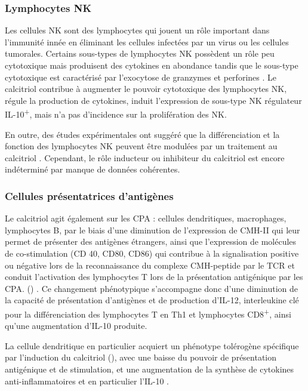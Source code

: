 \documentclass[
  a4paper,
  DIV=11,
  numbers=noendperiod,
  listof=totoc]{scrreprt}
\begin{document}
\subsubsection{Lymphocytes NK}\label{lymphocytes-nk}

Les cellules \ac{NK} sont des lymphocytes qui jouent un rôle important
dans l'immunité innée en éliminant les cellules infectées par un virus
ou les cellules tumorales. Certains sous-types de lymphocytes NK
possèdent un rôle peu cytotoxique mais produisent des cytokines en
abondance tandis que le sous-type cytotoxique est caractérisé par
l'exocytose de granzymes et perforines \autocite{Moretta.2008}. Le
calcitriol contribue à augmenter le pouvoir cytotoxique des lymphocytes
\ac{NK}, régule la production de cytokines, induit l'expression de
sous-type NK régulateur IL-10\textsuperscript{+}, mais n'a pas
d'incidence sur la prolifération des \ac{NK}.

En outre, des études expérimentales ont suggéré que la différenciation
et la fonction des lymphocytes \ac{NK} peuvent être modulées par un
traitement au calcitriol \autocite{Charoenngam.2020}. Cependant, le rôle
inducteur ou inhibiteur du calcitriol est encore indéterminé par manque
de données cohérentes.

\subsubsection{Cellules présentatrices
d'antigènes}\label{cellules-pruxe9sentatrices-dantiguxe8nes}

Le calcitriol agit également sur les \ac{CPA} : cellules dendritiques,
macrophages, lymphocytes B, par le biais d'une diminution de
l'expression de \ac{CMH-II} qui leur permet de présenter des antigènes
étrangers, ainsi que l'expression de molécules de co-stimulation
(\ac{CD} 40, CD80, CD86) qui contribue à la signalisation positive ou
négative lors de la reconnaissance du complexe CMH-peptide par le
\ac{TCR} et conduit l'activation des lymphocytes T lors de la
présentation antigénique par les \ac{CPA}. ()
\autocite{Charoenngam.2020,Meza-Meza.2022,Caprio.2017}. Ce changement
phénotypique s'accompagne donc d'une diminution de la capacité de
présentation d'antigènes et de production d'\ac{IL-12}, interleukine clé
pour la différenciation des lymphocytes T en Th1 et lymphocytes
CD8\textsuperscript{+}, ainsi qu'une augmentation d'\ac{IL-10} produite.

La cellule dendritique en particulier acquiert un phénotype tolérogène
spécifique par l'induction du calcitriol (), avec
une baisse du pouvoir de présentation antigénique et de stimulation, et
une augmentation de la synthèse de cytokines anti-inflammatoires et en
particulier l'IL-10 \autocite{Bishop.2021}.
\end{document}
